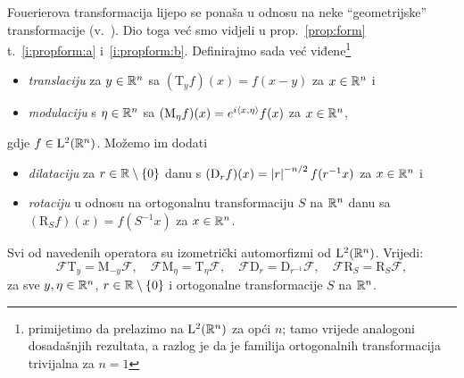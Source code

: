 \documentclass[main.tex]{subfiles}
\begin{document}
\newcommand{\fusnota}{\footnote{
		primijetimo da prelazimo na \( \L^2(\R^n) \) za opći \( n \);
		tamo vrijede analogoni dosadašnjih rezultata,
		a razlog je da je familija ortogonalnih
		transformacija trivijalna za \( n=1 \)
	}}
\begin{komentar}\label{kom:four-kovac}
	Fouerierova transformacija lijepo se ponaša u odnosu
	na neke \enquote{geometrijske} transformacije (v.~\cite[prop.~3]{kovac-wroclaw}).
	Dio toga već smo vidjeli u prop.~\ref{prop:form} t.~\ref{i:propform:a}
	i~\ref{i:propform:b}. Definirajmo sada već viđene\fusnota
	\begin{itemize}
		\item \emph{translaciju} za \( y \in \mathbb{R}^n \) sa
		      \( (\mathrm T_y f)(x) = f(x-y) \) za \( x \in \mathbb{R}^n \) i
		\item \emph{modulaciju} s \( \eta \in \mathbb{R}^n \) sa
		      \( (\mathrm M_\eta f)(x) = e^{i\left\langle {x}, {\eta} \right\rangle}f(x) \) za \( x \in \mathbb{R}^n \),
	\end{itemize}
	gdje \( f \in \mathrm{L}^2(\mathbb{R}^n) \). Možemo im dodati
	\begin{itemize}
		\item \emph{dilataciju} za \( r \in \mathbb{R} \setminus \left\{ 0 \right\} \)
		      danu s \( (\mathrm D_r f)(x) = \left| {r} \right|^{-n/2}f(r^{-1}x) \) za \( x \in \mathbb{R}^n \) i
		\item \emph{rotaciju} u odnosu na ortogonalnu transformaciju \( S \)
		      na \( \mathbb{R}^n \) danu sa \( (\mathrm R_S f)(x) = f(S^{-1}x) \) za \( x \in \mathbb{R}^n \).
	\end{itemize}
	Svi od navedenih operatora su izometrički automorfizmi
	od \( \mathrm{L}^2(\mathbb{R}^n) \). Vrijedi:
	\begin{equation}\label{eq:four-kovac}
		\mathcal F \mathrm T_y = \mathrm M_{-y} \mathcal F, \quad
		\mathcal F \mathrm M_\eta = \mathrm T_\eta \mathcal F, \quad
		\mathcal F \mathrm D_r = \mathrm D_{r^{-1}} \mathcal F, \quad
		\mathcal F \mathrm R_S = \mathrm R_S \mathcal F,
	\end{equation}
	za sve \( y, \eta \in \mathbb{R}^n \), \( r \in \mathbb{R} \setminus \left\{0\right\} \)
	i ortogonalne transformacije \( S \) na \( \mathbb{R}^n \).
\end{komentar}
\end{document}
